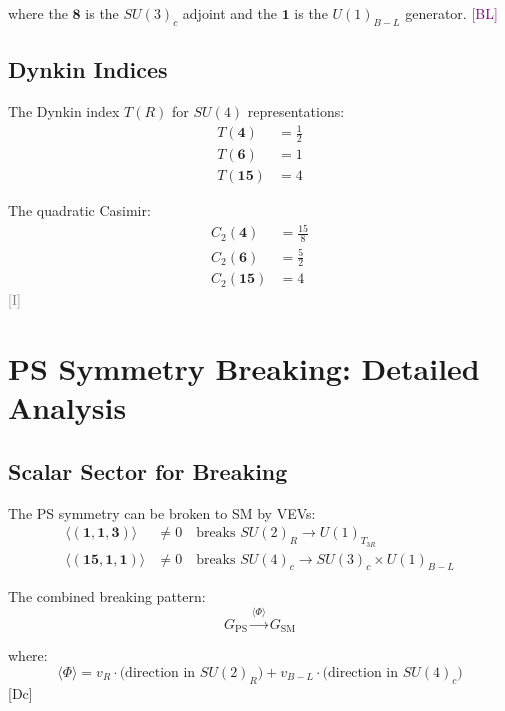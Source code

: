 \documentclass[11pt,a4paper]{article}
\newcommand{\tagDc}{\textcolor{blue!50!black}{[Dc]}}
\newcommand{\tagI}{\textcolor{gray}{[I]}}
\newcommand{\tagBL}{\textcolor{purple}{[BL]}}
\begin{document}
where the $\mathbf{8}$ is the $SU(3)_c$ adjoint and the $\mathbf{1}$ is the $U(1)_{B-L}$ generator.
\tagBL

\subsection{Dynkin Indices}

The Dynkin index $T(R)$ for $SU(4)$ representations:
\begin{align}
\label{eq:dynkin-4}
T(\mathbf{4}) &= \frac{1}{2} \\
\label{eq:dynkin-6}
T(\mathbf{6}) &= 1 \\
\label{eq:dynkin-15}
T(\mathbf{15}) &= 4
\end{align}

The quadratic Casimir:
\begin{align}
\label{eq:casimir-4}
C_2(\mathbf{4}) &= \frac{15}{8} \\
\label{eq:casimir-6}
C_2(\mathbf{6}) &= \frac{5}{2} \\
\label{eq:casimir-15}
C_2(\mathbf{15}) &= 4
\end{align}
\tagI

\section{PS Symmetry Breaking: Detailed Analysis}
\label{app:ps-breaking}

\subsection{Scalar Sector for Breaking}

The PS symmetry can be broken to SM by VEVs:
\begin{align}
\label{eq:vev-1}
\langle (\mathbf{1}, \mathbf{1}, \mathbf{3}) \rangle &\neq 0 \quad \text{breaks } SU(2)_R \to U(1)_{T_{3R}} \\
\label{eq:vev-2}
\langle (\mathbf{15}, \mathbf{1}, \mathbf{1}) \rangle &\neq 0 \quad \text{breaks } SU(4)_c \to SU(3)_c \times U(1)_{B-L}
\end{align}

The combined breaking pattern:
\begin{equation}
\label{eq:combined-breaking}
G_{\text{PS}} \xrightarrow{\langle\Phi\rangle} G_{\text{SM}}
\end{equation}

where:
\begin{equation}
\label{eq:vev-direction}
\langle\Phi\rangle = v_R \cdot \text{(direction in } SU(2)_R) + v_{B-L} \cdot \text{(direction in } SU(4)_c)
\end{equation}
\tagDc
\end{document}
